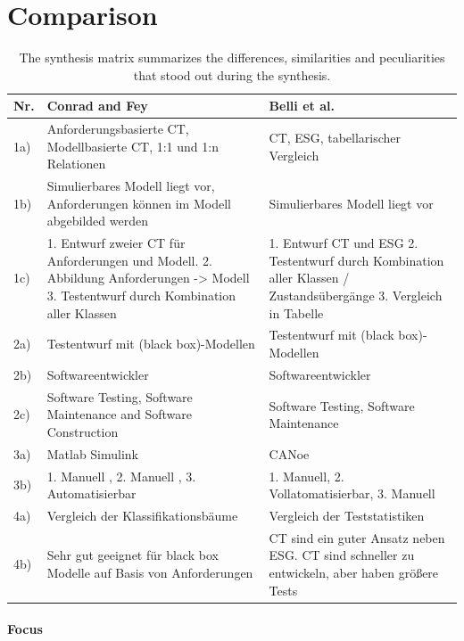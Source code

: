 \section{Comparison}
\label{Kap:Comparison}

\begin{small} 		
	\begin{longtable}[h]{p{0.45cm}|p{}|p{}}
	\caption{The synthesis matrix summarizes the differences, similarities and peculiarities that stood out during the synthesis.}
	\label{tab:synthesematrix_julian}
	\\    %
	\hline
	\textbf{Nr.} & \textbf{Conrad and Fey} & \textbf{Belli et al.} \\
	\hline
	1a) & Anforderungsbasierte CT, Modellbasierte CT,  1:1 und 1:n Relationen & CT, ESG, tabellarischer Vergleich \\
	\hline	
	1b) & Simulierbares Modell liegt vor, Anforderungen können im Modell abgebilded werden & Simulierbares Modell liegt vor \\
	\hline	
	1c) & 1. Entwurf zweier CT für Anforderungen und Modell. 2. Abbildung Anforderungen -> Modell 3. Testentwurf durch Kombination aller Klassen & 1. Entwurf CT und ESG 2. Testentwurf durch Kombination aller Klassen / Zustandsübergänge 3. Vergleich in Tabelle \\
	\hline	
	2a) & Testentwurf mit (black box)-Modellen & Testentwurf mit (black box)-Modellen \\
	\hline	
	2b) & Softwareentwickler & Softwareentwickler \\
	\hline	
	2c) & Software Testing, Software Maintenance and Software Construction & Software Testing, Software Maintenance \\
	\hline
	3a) & Matlab Simulink & CANoe \\
	\hline
	3b) & 1. Manuell , 2. Manuell , 3. Automatisierbar & 1. Manuell, 2. Vollatomatisierbar, 3. Manuell \\
	\hline	
	4a) & Vergleich der Klassifikationsbäume & 
	Vergleich der Teststatistiken  \\
	\hline	
	4b) & Sehr gut geeignet für black box Modelle auf Basis von Anforderungen & CT sind ein guter Ansatz neben ESG. CT sind schneller zu entwickeln, aber haben größere Tests \\
	\hline	
	\end{longtable}
\end{small}


\newpage
\paragraph{Focus}

